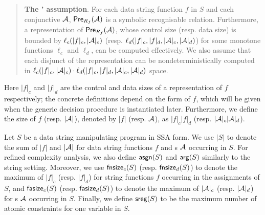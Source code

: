 \begin{quote}
{\bf The \prerec{}' assumption}. For each data string function $f$ in $S$ and each conjunctive \SA{} $\mathcal{A}$,  $\textsf{Pre}_{R_f}(\mathcal{A})$ is a symbolic recognisable relation. Furthermore, 
a representation of $\textsf{Pre}_{R_f}(\mathcal{A})$, whose control size (resp. data size) is bounded by  $\ell_c(|f|_c, |\mathcal{A}|_c)$ (resp. $\ell_d(|f|_c,  |f|_d, |\mathcal{A}|_c, |\mathcal{A}|_d)$) for some monotone functions $\ell_c$ and $\ell_d$, can be computed effectively. We also assume that each disjunct of the representation can be nondeterministically computed in $\ell_c(|f|_c, |\mathcal{A}|_c) \cdot \ell_d(|f|_c,  |f|_d, |\mathcal{A}|_c,  |\mathcal{A}|_d)$ space.
%
\end{quote} 
%
Here $|f|_c$ and $|f|_d$ are the control and data sizes of a representation of $f$ respectively; the concrete definitions depend on the form of $f$, which will be given when the generic decision procedure is instantiated later. Furthermore, we define the size of $f$ (resp. $|\mathcal{A}|$), denoted by $|f|$ (resp. $\mathcal{A}$), as $|f|_c |f|_d$ (resp. $|\mathcal{A}|_c |\mathcal{A}|_d$).

Let $S$ be a data string manipulating program in SSA form.  We use $|S|$ to denote the sum of $|f|$ and $|\mathcal{A}|$ for data string functions $f$ and \SA{}s $\mathcal{A}$ occurring in $S$.  
For refined complexity analysis, we also define $\mathsf{asgn}(S)$ and $\mathsf{arg}(S)$ similarly to the string setting. Moreover, we use $\mathsf{fnsize}_c(S)$ (resp. $\mathsf{fnsize}_d(S)$) to denote the maximum of $|f|_c$ (resp. $|f|_d$) for string functions $f$ occurring in the assignments of $S$, and $\mathsf{fasize}_c(S)$ (resp. $\mathsf{fasize}_d(S)$) to denote the maximum of $|\mathcal{A}|_c$ (resp. $|\mathcal{A}|_d$) for \SA{}s $\mathcal{A}$ occurring in $S$. Finally, we define $\mathsf{sreg}(S)$ to be the maximum number of atomic \SA{} constraints for one variable in $S$.





